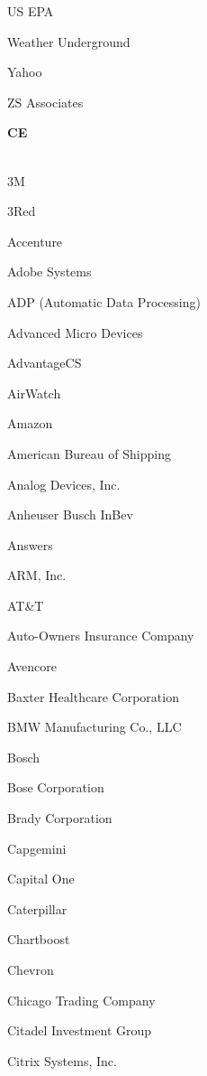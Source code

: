 \documentclass[twoside]{article}
\begin{document}
\begin{center}
\begin{multicols}{5}
\begin{FlushLeft}
\begin{compactitem}
\item US EPA
\item Weather Underground
\item Yahoo
\item ZS Associates
\end{compactitem}
        \end{FlushLeft}
        \vspace{1em}
        {\fontsize{14}{16}\selectfont \bf CE}\\
        \vspace{-1em}
        ~\hrulefill~
        \vspace{-.9em}
        \begin{FlushLeft}
        \begin{compactitem}
        \item 3M
\item 3Red
\item Accenture
\item Adobe Systems
\item ADP (Automatic Data Processing)
\item Advanced Micro Devices
\item AdvantageCS
\item AirWatch
\item Amazon
\item American Bureau of Shipping
\item Analog Devices, Inc.
\item Anheuser Busch InBev
\item Answers
\item ARM, Inc.
\item AT\&T
\item Auto-Owners Insurance Company
\item Avencore
\item Baxter Healthcare Corporation
\item BMW Manufacturing Co., LLC
\item Bosch
\item Bose Corporation
\item Brady Corporation
\item Capgemini
\item Capital One
\item Caterpillar
\item Chartboost
\item Chevron
\item Chicago Trading Company
\item Citadel Investment Group
\item Citrix Systems, Inc.

\end{compactitem}
\end{FlushLeft}
\end{multicols}
\end{center}
\end{document}
